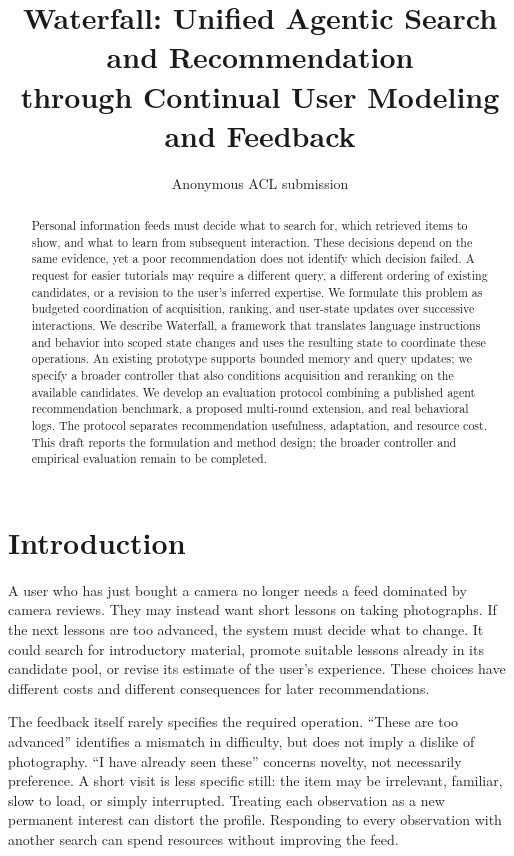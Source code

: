 \documentclass[11pt]{article}
\title{Waterfall: Unified Agentic Search and Recommendation\\
through Continual User Modeling and Feedback}
\author{Anonymous ACL submission}
\begin{document}
\maketitle

\begin{abstract}
Personal information feeds must decide what to search for, which retrieved items to show, and what to learn from subsequent interaction. These decisions depend on the same evidence, yet a poor recommendation does not identify which decision failed. A request for easier tutorials may require a different query, a different ordering of existing candidates, or a revision to the user's inferred expertise. We formulate this problem as budgeted coordination of acquisition, ranking, and user-state updates over successive interactions. We describe Waterfall, a framework that translates language instructions and behavior into scoped state changes and uses the resulting state to coordinate these operations. An existing prototype supports bounded memory and query updates; we specify a broader controller that also conditions acquisition and reranking on the available candidates. We develop an evaluation protocol combining a published agent recommendation benchmark, a proposed multi-round extension, and real behavioral logs. The protocol separates recommendation usefulness, adaptation, and resource cost. This draft reports the formulation and method design; the broader controller and empirical evaluation remain to be completed.
\end{abstract}

\section{Introduction}
\label{sec:intro}

A user who has just bought a camera no longer needs a feed dominated by camera reviews. They may instead want short lessons on taking photographs. If the next lessons are too advanced, the system must decide what to change. It could search for introductory material, promote suitable lessons already in its candidate pool, or revise its estimate of the user's experience. These choices have different costs and different consequences for later recommendations.

The feedback itself rarely specifies the required operation. ``These are too advanced'' identifies a mismatch in difficulty, but does not imply a dislike of photography. ``I have already seen these'' concerns novelty, not necessarily preference. A short visit is less specific still: the item may be irrelevant, familiar, slow to load, or simply interrupted. Treating each observation as a new permanent interest can distort the profile. Responding to every observation with another search can spend resources without improving the feed.
\end{document}
